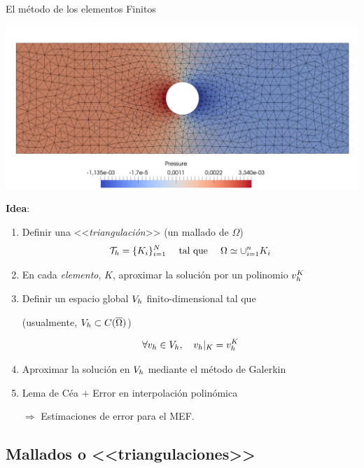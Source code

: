 \documentclass[9pt,leqno]{beamer}
\begin{document}
\begin{frame}{El método de los elementos Finitos}
  \vspace{-1.5em}
  \begin{flushright}
    \includegraphics[width=0.4\linewidth]{mef}
  \end{flushright}
  \vspace{-3em}

  {\large \textbf{Idea}}:
  \bigskip
  \begin{enumerate}\itemsep1em
  \item Definir una <<\alert{\textit{triangulación}}>> (un mallado de $\Omega$)
    $${\cal T}_h=\{K_i\}_{i=1}^N \quad\text{ tal que }\quad
    \Omega\simeq\cup_{i=1}^n K_i
    $$
  \item En cada \textit{elemento}, $K$, aproximar la solución por un
    \alert{polinomio $v_{h}^K$}
  \item Definir un \alert{espacio global $V_h$} finito-dimensional tal que
    \begin{flushright}
      \scriptsize (usualmente, $V_h\subset C(\overline\Omega)$)
    \end{flushright}
    $$
    \forall v_{h}\in V_h, \quad v_{h}|_K = v_{h}^K
    $$
  \item Aproximar la solución en $V_h$ mediante el método de \alert{Galerkin}

  \item Lema de Céa $+$ Error en interpolación polinómica
    \begin{flushright}
      $\Rightarrow$ \alert{Estimaciones de error} para el MEF.
    \end{flushright}
  \end{enumerate}
\end{frame}

\subsection{Mallados o <<triangulaciones>>}
\end{document}
